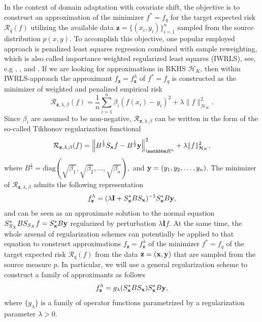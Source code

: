 \documentclass[USenglish]{article}
\newcommand{\norm}[1]{\left\lVert#1\right\rVert}
\newcommand{\lam}{\lambda}
\newcommand{\x}{{\bf x}}
\def\R{\mathbbm R}
\begin{document}
In the context of domain adaptation with covariate shift, the objective is to construct an approximation of the minimizer $f^* = f_q$ for the target expected risk $\mathcal{R}_q(f)$ utilizing the available data $\mathbf{z} = \{(x_i,y_i)\}_{i=1}^n$ sampled from the source distribution $p(x,y)$. To accomplish this objective, one popular employed approach is penalized least squares regression combined with sample reweighting, which is also called importance weighted regularized least squares (IWRLS), see, e.g \cite{evgeniou2000}, \cite{sugiyama2005}, and \cite{kanamori2009}. 
If we are looking for approximations in RKHS $\mathcal{H}_K$, then within IWRLS-approach the approximant $f_\mathbf{z} = f_\mathbf{z}^\lambda $ of $f^* = f_q$ is constructed as the minimizer of weighted and penalized empirical risk
$$ \mathcal{R}_{\mathbf{z},\lambda,\beta} (f) = \frac{1}{n} \sum_{i=1}^{n} \beta_i \left( f(x_i) - y_i \right)^2 + \lambda \| f\|^2_{\mathcal{H}_K}.$$
Since $\beta_i$ are assumed to be non-negative, $ \mathcal{R}_{\mathbf{z},\lambda,\beta}  $ can be written in the form of the so-called Tikhonov regularization functional
$$ \mathcal{R}_{\mathbf{z},\lambda,\beta} (f) =\norm{B^{\frac{1}{2}} S_{\x} f - B^{\frac{1}{2}} {\bf y} }^2_{\R^n} + \lambda \| f\|^2_{\mathcal{H}_K}, $$ where $B^{\frac{1}{2}} = \mathrm{diag}(\sqrt{\beta_1},\sqrt{\beta_2},\ldots,\sqrt{\beta_n}),$ and ${\bf y} = (y_1,y_2,\ldots,y_n)$. The minimizer of $\mathcal{R}_{\mathbf{z},\lambda,\beta}$ admits the following representation 
\begin{align}\label{A.eq2.1.2}
f_\mathbf{z}^\lambda = (\lambda \mathbf{I} + S^*_{{\x}}BS_{{\x}})^{-1} S^*_{{\x}} B {\bf y},
\end{align}
and can be seen as an approximate solution to the normal equation $S_{S_X}^* B S_{S_X}f = S^*_{{\x}} B {\bf y}$ regularized by perturbation $\lambda \mathbf{I}f$.
At the same time, the whole arsenal of regularization schemes can potentially be applied to that equation 
to construct approximations $f_\mathbf{z} = f_\mathbf{z}^\lambda$ of the minimizer $f^* = f_q$ of the target expected risk $\mathcal{R}_q (f)$
from the data ${\bf z}=({\x}, {\bf y})$ that are sampled from the source measure $p$. In particular, we will use a general regularization scheme to construct a family of 
approximants as follows
\begin{align}\label{A.eq2.1.5}
f_\mathbf{z}^\lambda = g_\lambda (S_{{\x}}^* B S_{{\x}} ) S_{{\x}}^* B {\bf y},
\end{align}
where $\{g_\lam\}$ is a family of operator functions parametrized by a regularization parameter $\lam >0$.
\end{document}
